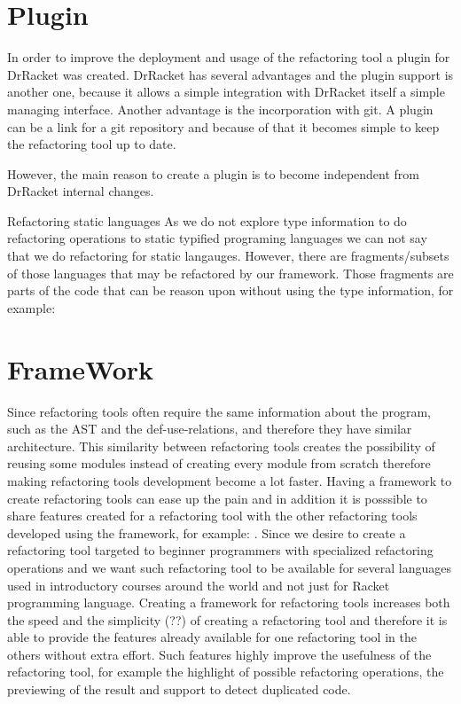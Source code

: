 
\section{Plugin} %

In order to improve the deployment and usage of the refactoring tool a plugin
for DrRacket was created.
DrRacket has several advantages and the plugin support is another one, because
it allows a simple integration with DrRacket itself a simple managing interface.
Another advantage is the incorporation with git. A plugin can be a link for a git
repository and because of that it becomes simple to keep the refactoring tool up to date.

However, the main reason to create a plugin is to become independent from DrRacket
internal changes.

Refactoring static languages
As we do not explore type information to do refactoring operations to static typified
programing languages we can not say that we do refactoring for static langauges.
However, there are fragments/subsets of those languages that may be refactored by our
framework. Those fragments are parts of the code that can be reason upon without using
the type information, for example:
\section{FrameWork}
Since refactoring tools often require the same information about the program, such as
the AST and the def-use-relations, and therefore they have similar architecture.
This similarity between refactoring tools creates the possibility of reusing some modules
instead of creating every module from scratch therefore making refactoring tools
development become a lot faster.
Having a framework to create refactoring tools can ease up the pain and in addition
it is posssible to share features created for a refactoring tool with the other refactoring
tools developed using the framework, for example: .
Since we desire to create a refactoring tool targeted to beginner programmers with
specialized refactoring operations and we want such refactoring tool to be available
for several languages used in introductory courses around the world and not just for
Racket programming language.
Creating a framework for refactoring tools increases both the speed and the simplicity (??)
of creating a refactoring tool and therefore it is able to provide the features already available
for one refactoring tool in the others without extra effort. Such features highly improve
the usefulness of the refactoring tool, for example the highlight of possible refactoring
operations, the previewing of the result and support to detect duplicated code.


